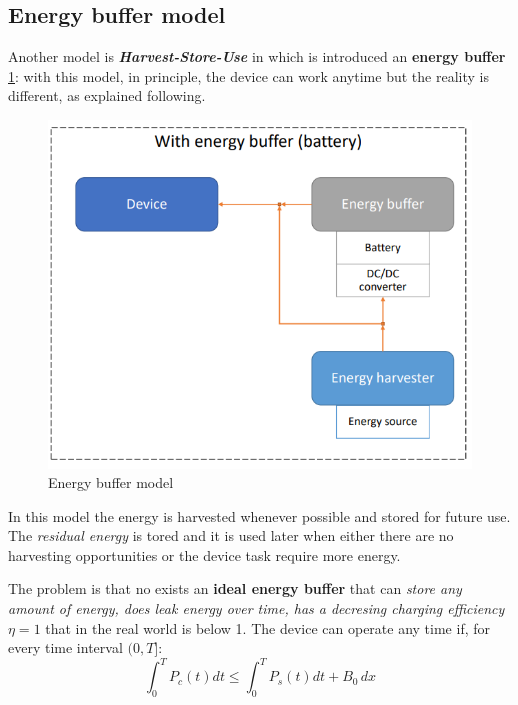 \documentclass[10pt,a4paper]{report}
\theoremstyle{definition}
\begin{document}
\subsection{Energy buffer model}\label{sec:energy-buffer-model}
Another model is \textbf{\textit{Harvest-Store-Use}} in which is introduced an \textbf{energy buffer} \ref{energy-buffer}: with this model, in principle, the device can work anytime but the reality is different, as explained following.
\begin{figure}[h]
	\centering\includegraphics[scale=0.40]{images/Pasted image 20230424163729.png}
	\caption{Energy buffer model}
\label{energy-buffer}
\end{figure}

In this model the energy is harvested whenever possible and stored for future use. The \textit{residual energy} is tored and it is used later when either there are no harvesting opportunities or the device task require more energy.

The problem is that no exists an \textbf{ideal energy buffer} that can \textit{store any amount of energy, does leak energy over time, has a decresing charging efficiency $\eta = 1$} that in the real world is below 1.
The device can operate any time if, for every time interval $(0,T]$:
\begin{equation}
	\int_{0}^{T} P_{c}(t)dt \leq \int_{0}^{T} P_{s}(t)dt + B_{0} \,dx
\end{equation}
\end{document}
